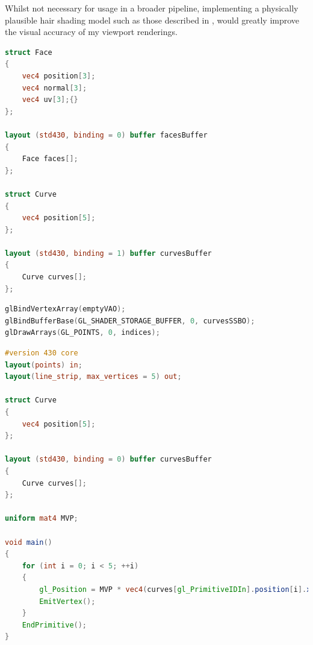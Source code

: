 \documentclass[]{acmsiggraph}
\begin{document}
Whilst not necessary for usage in a broader pipeline, implementing a physically plausible hair shading model such as those described in \cite{Marschner}, would greatly improve the visual accuracy of my viewport renderings.

\newpage




\newpage
\appendix

\begin{lstlisting}[language=GLSL, label={lst:buffers}, caption={Extract from the Distributor compute shader, showing how the Mesh and Curves buffers are accessed.}]
struct Face
{
	vec4 position[3];
	vec4 normal[3];
	vec4 uv[3];{}
};

layout (std430, binding = 0) buffer facesBuffer
{
	Face faces[];
};

struct Curve
{
	vec4 position[5];
};

layout (std430, binding = 1) buffer curvesBuffer
{
	Curve curves[];
};
\end{lstlisting}

\begin{lstlisting}[language=C++, label={lst:rendercpp}, caption={Extract from the C++ application code showing how Curves are rendered procedurally. \texttt{emptyVAO} is an empty Vertex Array Object, \texttt{curvesSSBO} is a \texttt{GL\_SHADER\_STORAGE\_BUFFER} containing vertex data for multiple curves, and \texttt{indices} is the number of curves in the buffer.}]
glBindVertexArray(emptyVAO);
glBindBufferBase(GL_SHADER_STORAGE_BUFFER, 0, curvesSSBO);
glDrawArrays(GL_POINTS, 0, indices);
\end{lstlisting}

\begin{lstlisting}[language=GLSL, label={lst:renderglsl}, caption={Extract from the curves rendering geometry shader, showing how vertex positions were processed from data stored in a bound \texttt{GL\_SHADER\_STORAGE\_BUFFER}.}]
#version 430 core
layout(points) in;
layout(line_strip, max_vertices = 5) out;

struct Curve
{
	vec4 position[5];
};

layout (std430, binding = 0) buffer curvesBuffer
{
	Curve curves[];
};

uniform mat4 MVP;

void main()
{
	for (int i = 0; i < 5; ++i)
	{
		gl_Position = MVP * vec4(curves[gl_PrimitiveIDIn].position[i].xyz, 1.0);
		EmitVertex();
	}
	EndPrimitive();
}
\end{lstlisting}
\end{document}
